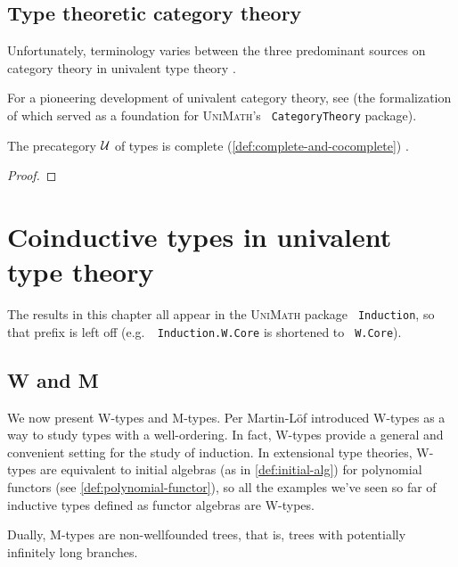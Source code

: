 \documentclass[12pt,twoside]{reedthesis}
\let\oldindex\index
\renewcommand{\index}[1]
               {\oldindex{#1}\marginpar{\footnotesize\color{index}index: #1}}
\newcommand{\indeX}{\oldindex}
\newcommand{\indeX}{\index}
\newcommand{\software}[1]{{\textsc{#1}}\indeX{#1}}
\newcommand{\UniMath}{\software{UniMath}}
\newcommand{\unimathname}[1]{\texttt{\footnotesize\color{accepted} #1}}
\begin{document}
\section{Type theoretic category theory}
\label{sec:type-theoretic-category-theory}

Unfortunately, terminology varies between the three predominant sources
on category theory in univalent type theory \cite{book} \cite{unimath}
\cite{hott-lib}.

For a pioneering development of univalent category theory, see \cite{rezk} (the
formalization of which served as a foundation for \UniMath{}'s
\unimathname{CategoryTheory} package).


\begin{theorem}
	The precategory $\mathcal{U}$ of types is complete
  (\cref{def:complete-and-cocomplete}) \cite{homotopy-limits}.
\end{theorem}
\begin{proof}

\end{proof}

\chapter{Coinductive types in univalent type theory}
\label{chap:coinductive-types-in-univalent-type-theory}

The results in this chapter all appear in the \UniMath{} package
\unimathname{Induction}, so that prefix is left off
(e.g.\ \unimathname{Induction.W.Core} is shortened to
\unimathname{W.Core}).

\section{W and M}
\label{sec:w-and-m}

We now present W-types and M-types. Per Martin-Löf introduced W-types as a
way to study types with a well-ordering. In fact, W-types provide a general and
convenient setting for the study of induction. In extensional type theories,
W-types are equivalent to initial algebras (as in \cref{def:initial-alg}) for
polynomial functors (see \cref{def:polynomial-functor}), so all the examples
we've seen so far of inductive types defined as functor algebras are W-types.

Dually, M-types are non-wellfounded trees, that is, trees with potentially
infinitely long branches.
\end{document}
